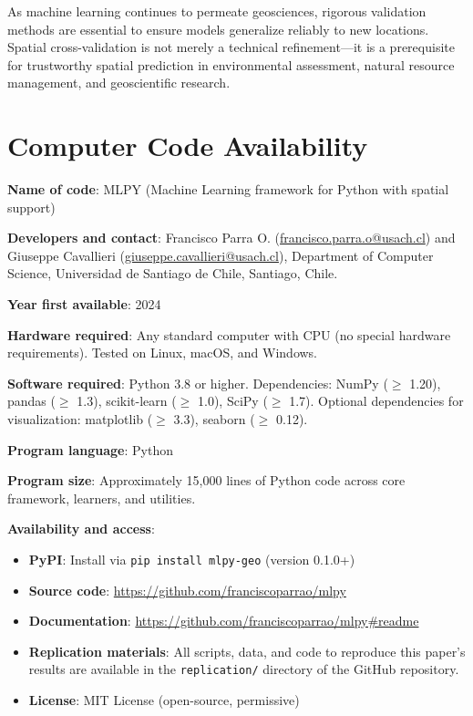 \documentclass[review,12pt]{elsarticle}
\begin{document}
As machine learning continues to permeate geosciences, rigorous validation methods are essential to ensure models generalize reliably to new locations. Spatial cross-validation is not merely a technical refinement---it is a prerequisite for trustworthy spatial prediction in environmental assessment, natural resource management, and geoscientific research.


\section*{Computer Code Availability}

\textbf{Name of code}: MLPY (Machine Learning framework for Python with spatial support)

\textbf{Developers and contact}: Francisco Parra O. (\href{mailto:francisco.parra.o@usach.cl}{francisco.parra.o@usach.cl}) and Giuseppe Cavallieri (\href{mailto:giuseppe.cavallieri@usach.cl}{giuseppe.cavallieri@usach.cl}), Department of Computer Science, Universidad de Santiago de Chile, Santiago, Chile.

\textbf{Year first available}: 2024

\textbf{Hardware required}: Any standard computer with CPU (no special hardware requirements). Tested on Linux, macOS, and Windows.

\textbf{Software required}: Python 3.8 or higher. Dependencies: NumPy ($\geq$ 1.20), pandas ($\geq$ 1.3), scikit-learn ($\geq$ 1.0), SciPy ($\geq$ 1.7). Optional dependencies for visualization: matplotlib ($\geq$ 3.3), seaborn ($\geq$ 0.12).

\textbf{Program language}: Python

\textbf{Program size}: Approximately 15,000 lines of Python code across core framework, learners, and utilities.

\textbf{Availability and access}:
\begin{itemize}
\item \textbf{PyPI}: Install via \texttt{pip install mlpy-geo} (version 0.1.0+)
\item \textbf{Source code}: \url{https://github.com/franciscoparrao/mlpy}
\item \textbf{Documentation}: \url{https://github.com/franciscoparrao/mlpy#readme}
\item \textbf{Replication materials}: All scripts, data, and code to reproduce this paper's results are available in the \texttt{replication/} directory of the GitHub repository.
\item \textbf{License}: MIT License (open-source, permissive)
\end{itemize}
\end{document}
